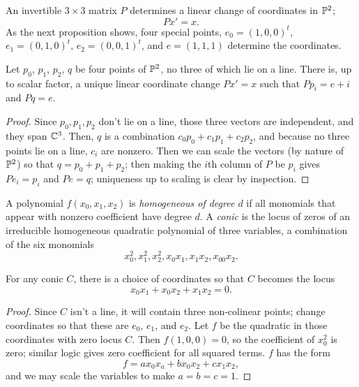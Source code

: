 \documentclass{report}
\begin{document}
An invertible $3 \times 3$ matrix $P$ determines a linear change of coordinates in $\mathbb{P}^2$;
\[ Px' = x. \]
As the next proposition shows, four special points, $e_0 = (1,0,0)^t$, $e_1 = (0,1,0)^t$, $e_2 = (0,0,1)^t$, and $e = (1,1,1)$ determine the coordinates.

\begin{proposition}
  Let $p_0$, $p_1$, $p_2$, $q$ be four points of $\mathbb{P}^2$, no three of which lie on a line.
  There is, up to scalar factor, a unique linear coordinate change $Px' = x$ such that $Pp_i = e+i$ and $Pq = e$.
\end{proposition}
\begin{proof}
  Since $p_0,p_1,p_2$ don't lie on a line, those three vectors are independent, and they span $\mathbb{C}^3$.
  Then, $q$ is a combination $c_0p_0 + c_1p_1 + c_2p_2$, and because no three points lie on a line, $c_i$ are nonzero.
  Then we can scale the vectors (by nature of $\mathbb{P}^2$) so that $q = p_0 + p_1 + p_2$; then making the $i$th column of $P$ be $p_i$ gives $Pe_i = p_i$ and $Pe = q$; uniqueness up to scaling is clear by inspection.
\end{proof}

A polynomial $f(x_0,x_1,x_2)$ is \emph{homogeneous of degree $d$} if all monomials that appear with nonzero coefficient have degree $d$.
A \emph{conic} is the locus of zeros of an irreducible homogeneous quadratic polynomial of three variables, a combination of the six monomials
\[
  x_0^2,x_1^2,x_2^2,x_0x_1,x_1x_2,x_00x_2.
\]
\begin{proposition}
  For any conic $C$, there is a choice of coordinates so that $C$ becomes the locus
  \[ x_0x_1 + x_0x_2 + x_1x_2 = 0. \]
\end{proposition}
\begin{proof}
  Since $C$ isn't a line, it will contain three non-colinear points;
  change coordinates so that these are $e_0$, $e_1$, and $e_2$.
  Let $f$ be the quadratic in those coordinates with zero locus $C$.
  Then $f(1,0,0) = 0$, so the coefficient of $x_0^2$ is zero; similar logic gives zero coefficient for all squared terms.
  $f$ has the form
  \[ f = ax_0x_a + bx_0x_2 + cx_1x_2, \]
  and we may scale the variables to make $a=b=c=1$.
\end{proof}
\end{document}
